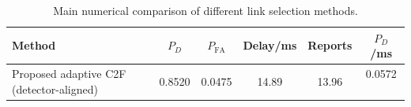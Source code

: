 \begin{table}[t]
    \centering
    \caption{Main numerical comparison of different link selection methods.}
    \label{tab:main_summary}
    \begin{tabular}{l c c c c c}
        \hline
        Method & $P_D$ & $P_{\mathrm{FA}}$ & Delay/ms & Reports & $P_D$/ms \\
        \hline
        Proposed adaptive C2F (detector-aligned) & 0.8520 & 0.0475 & 14.89 & 13.96 & 0.0572 \
        \hline
    \end{tabular}
\end{table}
